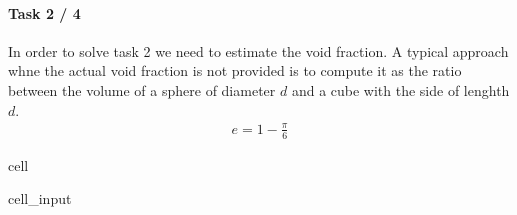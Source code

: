\documentclass[letterpaper,10pt,english]{jupyterBook}
\begin{document}
\paragraph{Task 2 / 4}
\label{\detokenize{Exercise_W11_2021:task-2-4}}
\sphinxAtStartPar
In order to solve task 2 we need to estimate the void fraction. A typical approach whne the actual void fraction is not provided is to compute it as the ratio between the volume of a sphere of diameter \(d\) and a cube with the side of lenghth \(d\).
\begin{equation*}
\begin{split}
e=1-\frac{\pi}{6}
\end{split}
\end{equation*}
\begin{sphinxuseclass}{cell}\begin{sphinxVerbatimInput}

\begin{sphinxuseclass}{cell_input}
\begin{sphinxVerbatim}[commandchars=\\\{\}]
 

 
 

   
     
 
 


\end{sphinxVerbatim}
\end{sphinxuseclass}
\end{sphinxVerbatimInput}
\end{sphinxuseclass}
\end{document}
